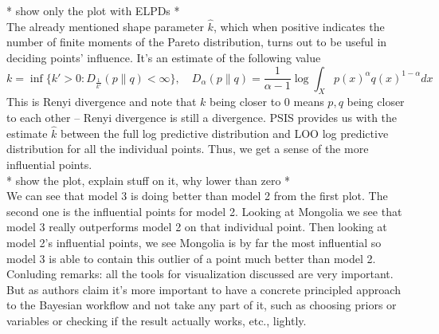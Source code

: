 \documentclass[]{article}
\begin{document}
* show only the plot with ELPDs * \\

\noindent The already mentioned shape parameter $\hat{k}$, which when positive indicates the number of finite moments of the Pareto distribution, turns out to be useful in deciding points' influence. It's an estimate of the following value
$$
k = \inf\{ k' > 0 : D_{\frac{1}{k'}}(p \| q) < \infty \}, \quad D_{\alpha}(p \| q) = \frac{1}{\alpha - 1} \log \int_{X} p(x)^{\alpha} q(x)^{1-\alpha} dx
$$
This is Renyi divergence and note that $k$ being closer to $0$ means $p, q$ being closer to each other -- Renyi divergence is still a divergence. PSIS provides us with the estimate $\hat{k}$ between the full log predictive distribution and LOO log predictive distribution for all the individual points. Thus, we get a sense of the more influential points. \\

* show the plot, explain stuff on it, why lower than zero * \\

\noindent We can see that model 3 is doing better than model 2 from the first plot. The second one is the influential points for model 2. Looking at Mongolia we see that model 3 really outperforms model 2 on that individual point. Then looking at model 2's influential points, we see Mongolia is by far the most influential so model 3 is able to contain this outlier of a point much better than model 2. \\

\noindent Conluding remarks: all the tools for visualization discussed are very important. But as authors claim it's more important to have a concrete principled approach to the Bayesian workflow and not take any part of it, such as choosing priors or variables or checking if the result actually works, etc., lightly.
\end{document}
